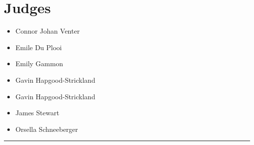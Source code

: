 \documentclass[10pt]{article}
\begin{document}
		\section*{\faUsers \: Judges}

		

	\begin{multicols}{2}

		\begin{itemize}
									\item Connor Johan Venter
									\item Emile Du Plooi
									\item Emily Gammon
									\item Gavin Hapgood-Strickland
						\end{itemize}

		\vfill\null
		\columnbreak

		\begin{itemize}
									\item Gavin Hapgood-Strickland
									\item James Stewart
									\item Orsella Schneeberger
						\end{itemize}

		\vfill\null

		\end{multicols}



			\vspace{0.5cm}
	\hrule
	\vspace{0.5cm}
\end{document}
